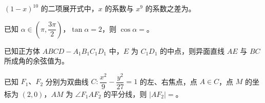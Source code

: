\begin{question}
$(1-x)^{10}$ 的二项展开式中，$x$ 的系数与 $x^9$ 的系数之差为\gkblank{}。

\end{question}
\begin{question}
已知 $\alpha\in\left(\pi,\dfrac{3\pi}{2}\right)$，$\tan\alpha=2$，则 $\cos\alpha=$\gkblank{}。

\end{question}
\begin{question}
已知正方体 $ABCD-A_1B_1C_1D_1$ 中，$E$ 为 $C_1D_1$ 的中点，则异面直线 $AE$ 与 $BC$ 所成角的余弦值为\gkblank{}。

\end{question}
\begin{question}
已知 $F_1\text{、}F_2$ 分别为双曲线 $C:\dfrac{x^2}{9}-\dfrac{y^2}{27}=1$ 的左、右焦点，点 $A\in C$，点 $M$ 的坐标为 $(2,0)$，$AM$ 为 $\angle F_1AF_2$ 的平分线，则 $|AF_2|=$\gkblank{}。

\end{question}

